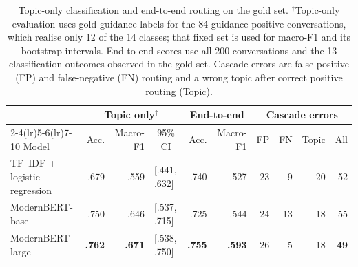 \begin{table}[t]
\centering
\footnotesize
\setlength{\tabcolsep}{3.5pt}
\begin{tabular}{lrrlrrrrrr}
\toprule
& \multicolumn{3}{c}{Topic only$^{\dagger}$} & \multicolumn{2}{c}{End-to-end} & \multicolumn{4}{c}{Cascade errors} \\
\cmidrule(lr){2-4}\cmidrule(lr){5-6}\cmidrule(lr){7-10}
Model & Acc. & Macro-F1 & \multicolumn{1}{c}{95\% CI} & Acc. & Macro-F1 & FP & FN & Topic & All \\
\midrule
TF--IDF + logistic regression & .679 & .559 & [.441, .632] & .740 & .527 & 23 & 9 & 20 & 52 \\
ModernBERT-base & .750 & .646 & [.537, .715] & .725 & .544 & 24 & 13 & 18 & 55 \\
ModernBERT-large & \textbf{.762} & \textbf{.671} & [.538, .750] & \textbf{.755} & \textbf{.593} & 26 & 5 & 18 & \textbf{49} \\
\bottomrule
\end{tabular}
\caption{Topic-only classification and end-to-end routing on the gold set. $^{\dagger}$Topic-only evaluation uses gold guidance labels for the 84 guidance-positive conversations, which realise only 12 of the 14 classes; that fixed set is used for macro-F1 and its bootstrap intervals. End-to-end scores use all 200 conversations and the 13 classification outcomes observed in the gold set. Cascade errors are false-positive (FP) and false-negative (FN) routing and a wrong topic after correct positive routing (Topic).}
\label{tab:gold-topic-cascade}
\end{table}
